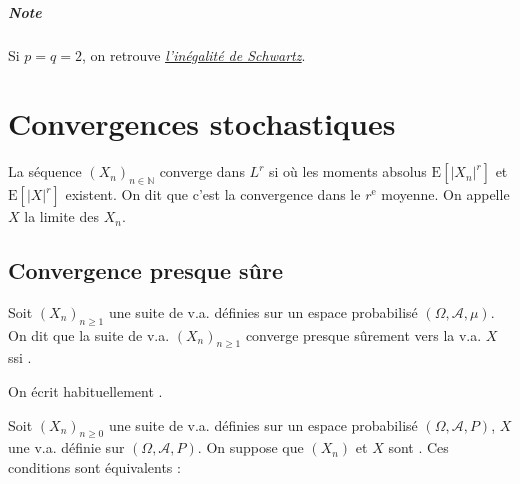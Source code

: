 \documentclass[10pt, french]{report}
\begin{document}
\begin{multicols*}{2}
\begin{definitionNOHFILL}
\paragraph{Note}	Si $p = q = 2$, on retrouve \textit{\color{bleudefrance}\underline{\hyperlink{SchwartzInegality}{\color{bleudefrance} l'inégalité de Schwartz}}}.
\end{definitionNOHFILL}



\newpage
\chapter{Convergences stochastiques}
\begin{definitionNOHFILL}[Convergence $L^{r}$]
La séquence $(X_{n})_{n \in \mathbb{N}}$ converge dans $L^{r}$ si  où les moments absolus $\text{E}[|X_{n}|^{r}]$ et $\text{E}[|X|^{r}]$ existent. On dit que c'est la convergence dans le $r^{\text{e}}$ moyenne. On appelle $X$ la limite des $X_{n}$.
\end{definitionNOHFILL}


\section{Convergence presque sûre}
\begin{definitionNOHFILL}
Soit $(X_{n})_{n \geq 1}$ une suite de v.a. définies sur un espace probabilisé $(\Omega, \mathcal{A}, \mu)$. On dit que la suite de v.a. $(X_{n})_{n \geq 1}$ converge presque sûrement vers la v.a. $X$ ssi . 

\bigskip

On écrit habituellement .
\end{definitionNOHFILL}

\begin{definitionNOHFILLprop}
Soit $(X_{n})_{n \geq 0}$ une suite de v.a. définies sur un espace probabilisé $(\Omega, \mathcal{A}, P)$, $X$ une v.a. définie sur $(\Omega, \mathcal{A}, P)$. On suppose que $(X_{n})$ et $X$ sont . Ces conditions sont équivalents : 


\end{definitionNOHFILLprop}
\end{multicols*}
\end{document}
